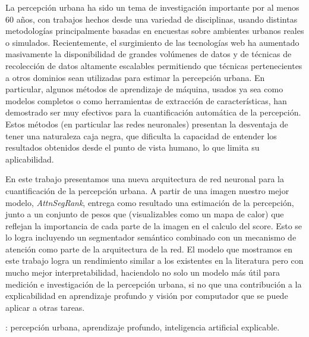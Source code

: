 La percepción urbana ha sido un tema de investigación importante por al menos 60 años, con trabajos
hechos desde una variedad de disciplinas, usando distintas metodologías principalmente basadas en encuestas
sobre ambientes urbanos reales o simulados. Recientemente, el surgimiento de las tecnologías web ha aumentado
masivamente la disponibilidad de grandes volúmenes de datos y de técnicas de recolección de datos altamente escalables
permitiendo que técnicas pertenecientes a otros dominios sean utilizadas para estimar la percepción urbana. En
particular, algunos métodos de aprendizaje de máquina, usados ya sea como modelos completos o como herramientas
de extracción de características, han demostrado ser muy efectivos para la cuantificación automática de la percepción.
Estos métodos (en particular las redes neuronales) presentan la desventaja de tener una naturaleza caja negra,
que dificulta la capacidad de entender los resultados obtenidos desde el punto de vista humano, lo que
limita su aplicabilidad.

En este trabajo presentamos una nueva arquitectura de red neuronal para la cuantificación de la percepción urbana.
A partir de una imagen nuestro mejor modelo, \textit{AttnSegRank}, entrega como resultado una estimación de la percepción,
junto a un conjunto de pesos que  (visualizables como un mapa de calor) que reflejan la importancia de cada parte de
la imagen en el calculo del score. Esto se lo logra incluyendo un segmentador semántico combinado con un mecanismo
de atención como parte de la arquitectura de la red. El modelo que mostramos en este trabajo logra un rendimiento similar
a los existentes en la literatura pero con  mucho mejor interpretabilidad,  haciendolo no solo un modelo más útil para
medición e investigación de la percepción urbana, si no que una contribución a la explicabilidad en aprendizaje profundo
y visión por computador que se puede aplicar a otras tareas.

\vfill
{}: percepción urbana, aprendizaje profundo, inteligencia artificial explicable.

